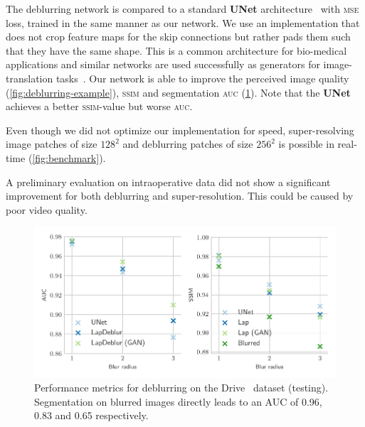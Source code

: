\documentclass{scrartcl}
\begin{document}
The deblurring network is compared to a standard \textbf{UNet} architecture~\cite{Unet} with \textsc{mse} loss, trained in the same manner as our network.
We use an implementation that does not crop feature maps for the skip connections but rather pads them such that they have the same shape.
This is a common architecture for bio-medical applications and similar networks are used successfully as generators for image-translation tasks~\cite{PatchGAN}.
Our network is able to improve the perceived image quality (\cref{fig:deblurring-example}), \textsc{ssim} and segmentation \textsc{auc} (\cref{fig:deblurring-metrics}).
Note that the \textbf{UNet} achieves a better \textsc{ssim}-value but worse \textsc{auc}.

Even though we did not optimize our implementation for speed, super-resolving image patches of size $128^2$ and deblurring patches of size $256^2$ is possible in real-time (\cref{fig:benchmark}).

A preliminary evaluation on intraoperative data did not show a significant improvement for both deblurring and super-resolution.
This could be caused by poor video quality.

\begin{figure}[htb]
\centering
\includegraphics[]{deblur_complete_paper}
\caption{Performance metrics for deblurring on the Drive~\cite{Drive} dataset (testing).\\
Segmentation on blurred images directly leads to an AUC of 0.96, 0.83 and 0.65 respectively.}
\label{fig:deblurring-metrics}
\end{figure}
\end{document}
